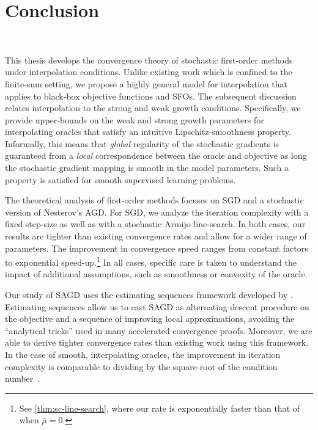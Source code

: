 \acresetall 
\chapter{Conclusion}~\label{ch:conclusion}

This thesis develops the convergence theory of stochastic first-order methods under interpolation conditions. 
Unlike existing work which is confined to the finite-sum setting, we propose a highly general model for interpolation that applies to black-box objective functions and \acp{SFO}. 
The subsequent discussion relates interpolation to the strong and weak growth conditions.
Specifically, we provide upper-bounds on the weak and strong growth parameters for interpolating oracles that satisfy an intuitive Lipschitz-smoothness property. 
Informally, this means that \emph{global} regularity of the stochastic gradients is guaranteed from a \emph{local} correspondence between the oracle and objective as long the stochastic gradient mapping is smooth in the model parameters. 
Such a property is satisfied for smooth supervised learning problems. 

The theoretical analysis of first-order methods focuses on \ac{SGD} and a stochastic version of Nesterov's \acl{AGD}. 
For \ac{SGD}, we analyze the iteration complexity with a fixed step-size as well as with a stochastic Armijo line-search.
In both cases, our results are tighter than existing convergence rates and allow for a wider range of parameters.
The improvement in convergence speed ranges from constant factors to exponential speed-up.\footnote{See \autoref{thm:sc-line-search}, where our rate is exponentially faster than that of \citet{vaswani2019painless} when \( \bar \mu = 0 \).} 
In all cases, specific care is taken to understand the impact of additional assumptions, such as smoothness or convexity of the oracle.

Our study of \ac{SAGD} uses the estimating sequences framework developed by \citet{nesterov2004lectures}.
Estimating sequences allow us to cast \ac{SAGD} as alternating descent procedure on the objective and a sequence of improving local approximations, avoiding the ``analytical tricks'' used in many accelerated convergence proofs. 
Moreover, we are able to derive tighter convergence rates than existing work using this framework. 
In the case of smooth, interpolating oracles, the improvement in iteration complexity is comparable to dividing by the square-root of the condition number~\citep{vaswani2019fast}.

